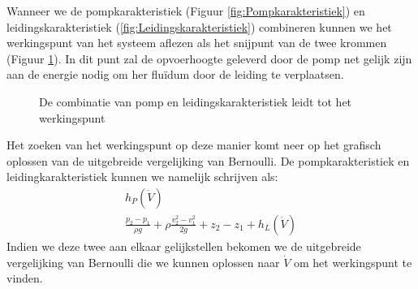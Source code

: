 Wanneer we de pompkarakteristiek (Figuur \ref{fig:Pompkarakteristiek}) en leidingskarakteristiek (\ref{fig:Leidingskarakteristiek}) combineren kunnen we het werkingspunt van het systeem aflezen als het snijpunt van de twee krommen (Figuur \ref{fig:Pompleidingkarakteristiek}). In dit punt zal de opvoerhoogte geleverd door de pomp net gelijk zijn aan de energie nodig om her flu\"idum door de leiding te verplaatsen.
\begin{figure}
	\centering
	
	\caption{De combinatie van pomp en leidingskarakteristiek leidt tot het werkingspunt}
	\label{fig:Pompleidingkarakteristiek}
\end{figure}
Het zoeken van het werkingspunt op deze manier komt neer op het grafisch oplossen van de uitgebreide vergelijking van Bernoulli. De pompkarakteristiek en leidingkarakteristiek kunnen we namelijk schrijven als:
\begin{eqnarray}
	h_P(\dot{V}) \\
	\frac{p_2-p_1}{\rho g} + \rho \frac{v_2^2-v_1^2}{2 g}  + z_2-z_1 + h_L(\dot{V})
\end{eqnarray}
Indien we deze twee aan elkaar gelijkstellen bekomen we de uitgebreide vergelijking van Bernoulli die we kunnen oplossen naar $\dot{V}$ om het werkingspunt te vinden.

